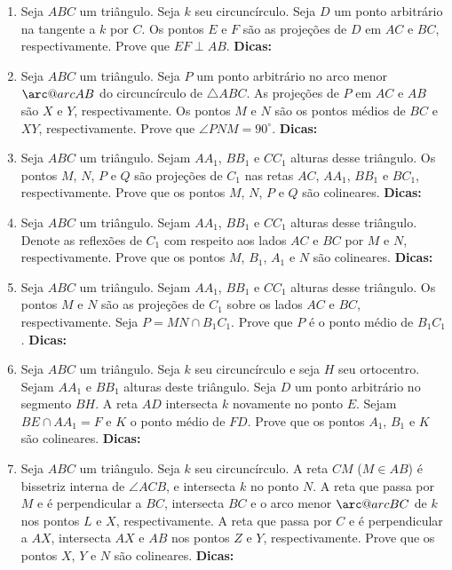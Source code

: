 \documentclass{article}
\makeatletter
\newcommand{\arc@char}{{\usefont{U}{tipa}{m}{n}\symbol{62}}}%
\newcommand{\arc}[1]{\mathpalette\arc@arc{#1}}
\newcommand{\arc@arc}[2]{
	\sbox0{$\m@th#1#2$}%
	\vbox{
		\hbox{\resizebox{\wd0}{\height}{\arc@char}}
		\nointerlineskip
		\box0
	}%
}
\newcommand{\dica}{\textbf{Dicas:}}
\newcommand{\iniTri}{Seja $ABC$ um triângulo}
\makeatother
\begin{document}
\begin{multicols}{2}
\begin{enumerate}
    \item \iniTri. Seja $k$ seu circuncírculo. Seja $D$ um ponto arbitrário na tangente a $k$ por $C$. Os pontos $E$ e $F$ são as projeções de $D$ em $AC$ e $BC$, respectivamente. Prove que $EF\perp AB$. \dica %
    
    \item \iniTri. Seja $P$ um ponto arbitrário no arco menor $\arc{AB}$ do circuncírculo de $\triangle ABC$. As projeções de $P$ em $AC$ e $AB$ são $X$ e $Y$, respectivamente. Os pontos $M$ e $N$ são os pontos médios de $BC$ e $XY$, respectivamente. Prove que $\angle PNM=90^{\circ}$. \dica %
    
    \item \iniTri. Sejam $AA_1$, $BB_1$ e $CC_1$ alturas desse triângulo. Os pontos $M$, $N$, $P$ e $Q$ são projeções de $C_1$ nas retas $AC$, $AA_1$, $BB_1$ e $BC_1$, respectivamente. Prove que os pontos $M$, $N$, $P$ e $Q$ são colineares. \dica %
    
    \item \iniTri. Sejam $AA_1$, $BB_1$ e $CC_1$ alturas desse triângulo. Denote as reflexões de $C_1$ com respeito aos lados $AC$ e $BC$ por $M$ e $N$, respectivamente. Prove que os pontos $M$, $B_1$, $A_1$ e $N$ são colineares. \dica %
    
    \item \iniTri. Sejam $AA_1$, $BB_1$ e $CC_1$ alturas desse triângulo. Os pontos $M$ e $N$ são as projeções de $C_1$ sobre os lados $AC$ e $BC$, respectivamente. Seja $P=MN\cap B_1C_1$. Prove que $P$ é o ponto médio de $B_1C_1$. \dica %
    
    \item \iniTri. Seja $k$ seu circuncírculo e seja $H$ seu ortocentro. Sejam $AA_1$ e $BB_1$ alturas deste triângulo. Seja $D$ um ponto arbitrário no segmento $BH$. A reta $AD$ intersecta $k$ novamente no ponto $E$. Sejam $BE\cap AA_1=F$ e $K$ o ponto médio de $FD$. Prove que os pontos $A_1$, $B_1$ e $K$ são colineares. \dica %
    
    \item \iniTri. Seja $k$ seu circuncírculo. A reta $CM$ ($M\in AB$) é bissetriz interna de $\angle ACB$, e intersecta $k$ no ponto $N$. A reta que passa por $M$ e é perpendicular a $BC$, intersecta $BC$ e o arco menor $\arc{BC}$ de $k$ nos pontos $L$ e $X$, respectivamente. A reta que passa por $C$ e é perpendicular a $AX$, intersecta $AX$ e $AB$ nos pontos $Z$ e $Y$, respectivamente. Prove que os pontos $X$, $Y$ e $N$ são colineares. \dica %
    

\end{enumerate}
\end{multicols}
\end{document}
